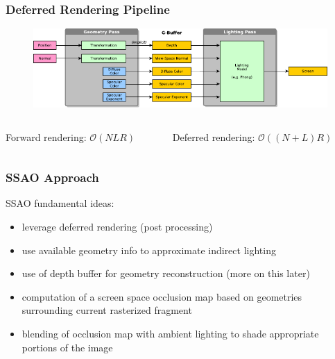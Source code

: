 \documentclass{beamer}
\begin{document}
\begin{frame}
\frametitle{Deferred Rendering Pipeline}
\begin{figure}
    \centering
    \includegraphics[width=0.9\linewidth]{images/deferred_rendering.pdf}
\end{figure}

\begin{columns}
    \begin{column}[t]{0.44\linewidth}
        Forward rendering: $\mathcal{O}(N L R)$
        \smaller
        \begin{algorithm}[H]
        \end{algorithm}
    \end{column}
    
    \begin{column}[t]{0.44\linewidth}
        Deferred rendering: $\mathcal{O}((N{+}L)R)$
        \smaller
        \begin{algorithm}[H]
        \end{algorithm}
    \end{column}
\end{columns}
\end{frame}

\begin{frame}
\frametitle{SSAO Approach}
SSAO fundamental ideas:
\begin{itemize}
    \item leverage deferred rendering (post processing)
    \item use available geometry info to approximate indirect lighting
    \item use of depth buffer for geometry reconstruction (more on this later)
    \item computation of a screen space occlusion map based on geometries surrounding current rasterized fragment
    \item blending of occlusion map with ambient lighting to shade appropriate portions of the image
\end{itemize}
\end{frame}
\end{document}
